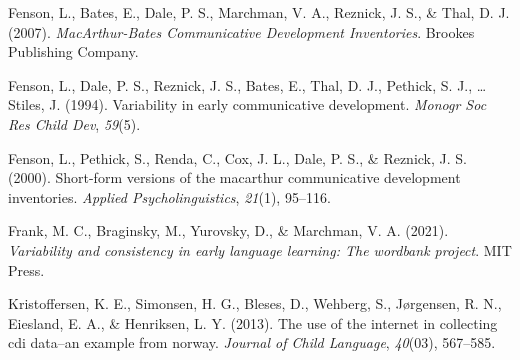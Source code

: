 \documentclass[
  english,
  man]{apa7}
\begin{document}
\leavevmode\hypertarget{ref-fenson2007}{}%
Fenson, L., Bates, E., Dale, P. S., Marchman, V. A., Reznick, J. S., \& Thal, D. J. (2007). \emph{MacArthur-Bates Communicative Development Inventories}. Brookes Publishing Company.

\leavevmode\hypertarget{ref-fenson1994}{}%
Fenson, L., Dale, P. S., Reznick, J. S., Bates, E., Thal, D. J., Pethick, S. J., \ldots{} Stiles, J. (1994). Variability in early communicative development. \emph{Monogr Soc Res Child Dev}, \emph{59}(5).

\leavevmode\hypertarget{ref-fenson2000b}{}%
Fenson, L., Pethick, S., Renda, C., Cox, J. L., Dale, P. S., \& Reznick, J. S. (2000). Short-form versions of the macarthur communicative development inventories. \emph{Applied Psycholinguistics}, \emph{21}(1), 95--116.

\leavevmode\hypertarget{ref-Frank2021}{}%
Frank, M. C., Braginsky, M., Yurovsky, D., \& Marchman, V. A. (2021). \emph{Variability and consistency in early language learning: The wordbank project}. MIT Press.

\leavevmode\hypertarget{ref-kristoffersen2013}{}%
Kristoffersen, K. E., Simonsen, H. G., Bleses, D., Wehberg, S., Jørgensen, R. N., Eiesland, E. A., \& Henriksen, L. Y. (2013). The use of the internet in collecting cdi data--an example from norway. \emph{Journal of Child Language}, \emph{40}(03), 567--585.

\endgroup
\end{document}
